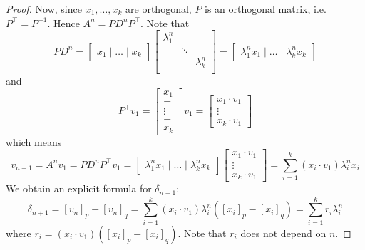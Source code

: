 \begin{proof}
    Now, since $x_1,\ldots,x_k$ are orthogonal, $P$ is an orthogonal matrix, i.e.
    $P^\top = P^{-1}$. Hence $A^n = PD^nP^\top$. Note that
    \[
        PD^n
        = \begin{bmatrix}
            x_1 \mid \ldots \mid x_k
        \end{bmatrix}
        \begin{bmatrix}
            \lambda_1^n &        &             \\
                        & \ddots &             \\
                        &        & \lambda_k^n \\
        \end{bmatrix}
        = \begin{bmatrix}
            \lambda_1^n x_1 \mid \ldots \mid \lambda_k^n x_k
        \end{bmatrix}
    \]
    and
    \[
        P^{\top}v_1
        = \begin{bmatrix}
            x_1 \\ - \\ \vdots \\ - \\ x_k
        \end{bmatrix} v_1
        = \begin{bmatrix}
            x_1 \cdot v_1 \\ \vdots \\ x_k \cdot v_1
        \end{bmatrix}
    \]
    which means
    \[
        v_{n+1}
        = A^nv_1
        = PD^nP^{\top}v_1
        = \begin{bmatrix}
            \lambda_1^n x_1 \mid \ldots \mid \lambda_k^n x_k
        \end{bmatrix}
        \begin{bmatrix}
            x_1 \cdot v_1 \\ \vdots \\ x_k \cdot v_1
        \end{bmatrix}
        = \sum_{i=1}^{k}{(x_i \cdot v_1) \lambda_i^n x_i}
    \]
    We obtain an explicit formula for $\delta_{n+1}$:
    \begin{equation}
        \label{td_eqn_delta_formula}
        \delta_{n+1}
        = [v_n]_p - [v_n]_q
        = \sum_{i=1}^{k}{
            (x_i \cdot v_1) \lambda_i^n \left( [x_i]_p - [x_i]_q \right)
        }
        = \sum_{i=1}^{k}{r_i \lambda_i^n}
    \end{equation}
    where $r_i = (x_i \cdot v_1)\left( [x_i]_p - [x_i]_q \right)$. Note that
    $r_i$ does not depend on $n$.


\end{proof}

